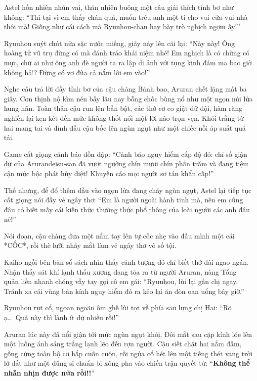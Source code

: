 \documentclass[../main.tex]{subfiles}
\begin{document}
Astel hồn nhiên nhún vai, thản nhiên buông một câu giải thích tỉnh bơ như không: ``Thì tại vì em thấy chán quá, muốn trêu anh một tí cho vui cửa vui nhà thôi mà! Giống như cái cách mà Ryuuhou-chan hay bày trò nghịch ngợm ấy!''

Ryuuhou suýt chút nữa sặc nước miếng, giãy nảy lên cãi lại: ``Này này! Ông hoàng tử vũ trụ đừng có mà đánh tráo khái niệm nhé! Em nghịch là có chừng có mực, chứ ai như ông anh đè người ta ra lập di ảnh với tụng kinh đám ma bao giờ không hả!? Đừng có vơ đũa cả nắm lôi em vào!''

Nghe câu trả lời đầy tỉnh bơ của cậu chàng Bảnh bao, Aruran chết lặng mất ba giây. Cơn thịnh nộ kìm nén bấy lâu nay bỗng chốc bùng nổ như một ngọn núi lửa hung hãn. Toàn thân cậu run lên bần bật, các thớ cơ co giật dữ dội, hàm răng nghiến lại ken két đến mức không thốt nổi một lời nào trọn vẹn. Khói trắng từ hai mang tai và đỉnh đầu cậu bốc lên ngùn ngụt như một chiếc nồi áp suất quá tải.

Game cất giọng cảnh báo dồn dập: ``Cảnh báo nguy hiểm cấp độ đỏ: chỉ số giận dữ của Arurandeisu-san đã vượt ngưỡng chín mươi chín phần trăm và đang tiệm cận mức bộc phát hủy diệt! Khuyến cáo mọi người sơ tán khẩn cấp!''

Thế nhưng, để đổ thêm dầu vào ngọn lửa đang cháy ngùn ngụt, Astel lại tiếp tục cất giọng nói đầy vẻ ngây thơ: ``Em là người ngoài hành tinh mà, nên em cũng đâu có biết mấy cái kiến thức thường thức phổ thông của loài người các anh đâu nè!''

Nói đoạn, cậu chàng đưa một nắm tay lên tự cốc nhẹ vào đầu mình một cái *CỐC*, rồi thè lưỡi nháy mắt làm vẻ ngây thơ vô số tội.


Kaiho ngồi bên bàn sổ sách nhìn thấy cảnh tượng đó chỉ biết thở dài ngao ngán. Nhận thấy sát khí lạnh thấu xương đang tỏa ra từ người Aruran, nàng Tổng quản liền nhanh chóng vẫy tay gọi cô em gái: ``Ryuuhou, lùi lại gần chị ngay. Tránh xa cái vùng bán kính nguy hiểm đó ra kẻo lại ăn đòn oan uổng bây giờ.''

Ryuuhou rụt cổ, ngoan ngoãn ôm ghế lùi tọt về phía sau lưng chị Hai: ``Rõ ạ\dots\ Quả này thì lành ít dữ nhiều rồi!''

Aruran lúc này đã nổi giận tới mức ngùn ngụt khói. Đôi mắt sau cặp kính lóe lên một luồng ánh sáng trắng lạnh lẽo đến rợn người. Cậu siết chặt hai nắm đấm, gồng cứng toàn bộ cơ bắp cuồn cuộn, rồi ngửa cổ hét lên một tiếng thét vang trời lở đất như một dũng sĩ chuẩn bị xông pha vào chiến trận quyết tử: ``\textbf{Không thể nhẫn nhịn được nữa rồi!!}''
\end{document}
